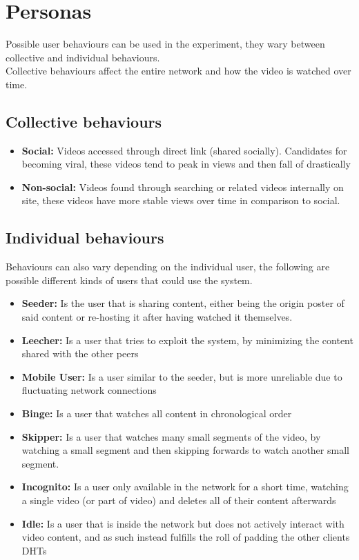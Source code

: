 \section{Personas}
Possible user behaviours can be used in the experiment, they wary between collective and individual behaviours.\\
Collective behaviours affect the entire network and how the video is watched over time.
\subsection{Collective behaviours}
\begin{itemize}
    \item \textbf{Social:}
    Videos accessed through direct link (shared socially). Candidates for becoming viral, these videos tend to peak in views and then fall of drastically
    \item \textbf{Non-social:}
    Videos found through searching or related videos internally on site, these videos have more stable views over time in comparison to social.
\end{itemize}

\subsection{Individual behaviours}
\label{sec:individual-behavious}
Behaviours can also vary depending on the individual user, the following are possible different kinds of users that could use the system.
\begin{itemize}
    \item \textbf{Seeder:}
    Is the user that is sharing content, either being the origin poster of said content or re-hosting it after having watched it themselves.
    \item \textbf{Leecher:}
    Is a user that tries to exploit the system, by minimizing the content shared with the other peers %
    \item \textbf{Mobile User:}
    Is a user similar to the seeder, but is more unreliable due to fluctuating network connections
    \item \textbf{Binge:}
    Is a user that watches all content in chronological order
    \item \textbf{Skipper:}
    Is a user that watches many small segments of the video, by watching a small segment and then skipping forwards to watch another small segment.
    \item \textbf{Incognito:}
    Is a user only available in the network for a short time, watching a single video (or part of video) and deletes all of their content afterwards
    \item \textbf{Idle:}
    Is a user that is inside the network but does not actively interact with video content, and as such instead fulfills the roll of padding the other clients \acs{DHT}s
\end{itemize}

